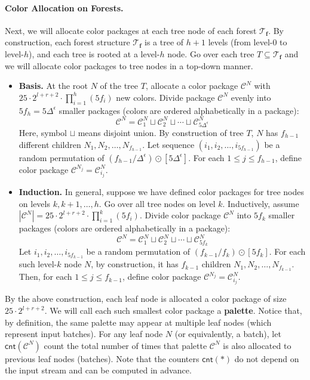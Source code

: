 \documentclass[11pt,a4paper]{article}
\newcommand{\tree}{\mathcal{T}}
\newcommand{\freq}{\mathbf{f}}
\newcommand{\clr}{\mathcal{C}}
\newcommand{\cnt}{\mathsf{cnt}}
\begin{document}
\paragraph*{Color Allocation on Forests.} Next, we will allocate color packages at each tree node of each forest $\tree_\freq$. By construction, each forest structure $\tree_\freq$ is a tree of $h+1$ levels (from level-$0$ to level-$h$), and each tree is rooted at a level-$h$ node. Go over each tree $T\subseteq \tree_\freq$ and we will allocate color packages to tree nodes in a top-down manner.
\begin{itemize}
	\item \textbf{Basis.} At the root $N$ of the tree $T$, allocate a color package $\clr^N$ with $25\cdot 2^{l+r+2}\cdot \prod_{i=1}^h (5f_i)$ new colors. Divide package $\clr^N$ evenly into $5f_h =5\Delta^\epsilon$ smaller packages (colors are ordered alphabetically in a package):
	$$\clr^N= \clr^N_1 \sqcup \clr^N_2 \sqcup \cdots \sqcup \clr^N_{5\Delta^\epsilon}$$
	Here, symbol $\sqcup$ means disjoint union. By construction of tree $T$, $N$ has $f_{h-1}$ different children $N_1, N_2, \ldots, N_{f_{h-1}}$. Let sequence $(i_1, i_2, \ldots, i_{5f_{h-1}})$ be a random permutation of $(f_{h-1} / \Delta^\epsilon)\odot [5\Delta^\epsilon]$. For each $1\leq j \leq f_{h-1}$, define color package $\clr^{N_j} = \clr^{N}_{i_j}$.
	
	\item \textbf{Induction.}
In general, suppose we have defined color packages for tree nodes on levels $k, k+1, \ldots, h$. Go over all tree nodes on level $k$. Inductively, assume $|\clr^N| = 25\cdot 2^{l+r+2}\cdot \prod_{i=1}^k (5f_i)$. Divide color package $\clr^N$ into $5f_k$ smaller packages (colors are ordered alphabetically in a package):
	$$\clr^N = \clr^N_1\sqcup \clr^N_2\sqcup \cdots \sqcup \clr^N_{5f_k}$$
	Let $i_1, i_2, \ldots, i_{5f_{k-1}}$ be a random permutation of $(f_{k-1} / f_k)\odot [5f_k]$. For each such level-$k$ node $N$, by construction, it has $f_{k-1}$ children $N_1, N_2, \ldots, N_{f_{k-1}}$. 
	Then, for each $1\leq j\leq f_{k-1}$, define color package $\clr^{N_j} = \clr^N_{i_j}$.
\end{itemize}
By the above construction, each leaf node is allocated a color package of size $25\cdot 2^{l+r+2}$. We will call each such smallest color package a \textbf{palette}. Notice that, by definition, the same palette may appear at multiple leaf nodes (which represent input batches). For any leaf node $N$ (or equivalently, a batch), let $\cnt(\clr^N)$ count the total number of times that palette $\clr^N$ is also allocated to previous leaf nodes (batches). Note that the counters $\cnt(*)$ do not depend on the input stream and can be computed in advance.
\end{document}
